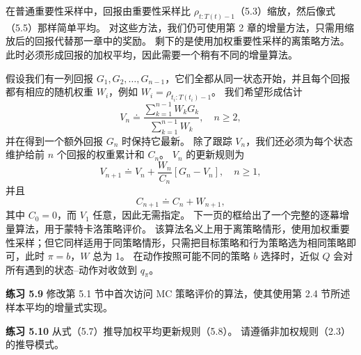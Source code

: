 \documentclass[UTF8,12pt,a4paper,fontset=fandol]{ctexart}
\begin{document}
在普通重要性采样中，回报由重要性采样比 $\rho_{t:T(t)-1}$（5.3）缩放，然后像式（5.5）那样简单平均。
对这些方法，我们仍可使用第 2 章的增量方法，只需用缩放后的回报代替那一章中的奖励。
剩下的是使用加权重要性采样的离策略方法。
此时必须形成回报的加权平均，因此需要一个稍有不同的增量算法。

假设我们有一列回报 $G_1,G_2,\ldots,G_{n-1}$，它们全都从同一状态开始，并且每个回报都有相应的随机权重 $W_i$，例如 $W_i=\rho_{t_i:T(t_i)-1}$。
我们希望形成估计
\begin{equation}
V_n\doteq
\frac{\sum_{k=1}^{n-1}W_kG_k}{\sum_{k=1}^{n-1}W_k},
\quad n\ge 2,
\end{equation}
并在得到一个额外回报 $G_n$ 时保持它最新。
除了跟踪 $V_n$，我们还必须为每个状态维护给前 $n$ 个回报的权重累计和 $C_n$。
$V_n$ 的更新规则为
\begin{equation}
V_{n+1}\doteq V_n+\frac{W_n}{C_n}\left[G_n-V_n\right],
\quad n\ge 1,
\end{equation}
并且
\[
C_{n+1}\doteq C_n+W_{n+1},
\]
其中 $C_0=0$，而 $V_1$ 任意，因此无需指定。
下一页的框给出了一个完整的逐幕增量算法，用于蒙特卡洛策略评价。
该算法名义上用于离策略情形，使用加权重要性采样；但它同样适用于同策略情形，只需把目标策略和行为策略选为相同策略即可，此时 $\pi=b$，$W$ 总为 1。
在动作按照可能不同的策略 $b$ 选择时，近似 $Q$ 会对所有遇到的状态--动作对收敛到 $q_\pi$。

\noindent\textbf{练习 5.9}
修改第 5.1 节中首次访问 MC 策略评价的算法，使其使用第 2.4 节所述样本平均的增量式实现。

\noindent\textbf{练习 5.10}
从式（5.7）推导加权平均更新规则（5.8）。
请遵循非加权规则（2.3）的推导模式。

\begin{center}
\end{center}
\end{document}
